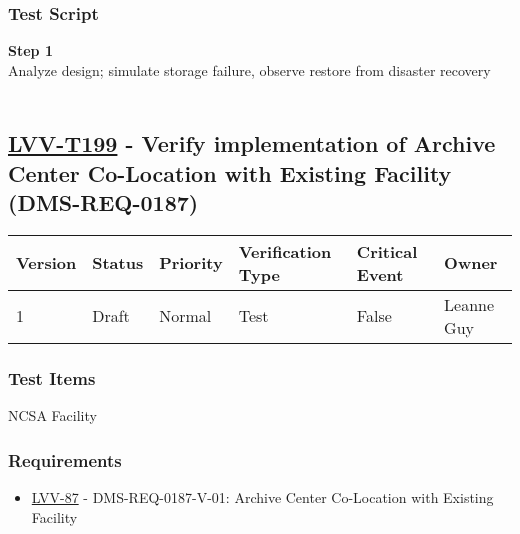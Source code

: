 \hypertarget{test-script-175}{%
\subsubsection{Test Script}\label{test-script-175}}

\textbf{Step 1}\\
Analyze design; simulate storage failure, observe restore from disaster
recovery\\
~\\

\hypertarget{lvv-t199---verify-implementation-of-archive-center-co-location-with-existing-facility-dms-req-0187}{%
\subsection{\texorpdfstring{\href{https://jira.lsstcorp.org/secure/Tests.jspa\#/testCase/LVV-T199}{LVV-T199}
- Verify implementation of Archive Center Co-Location with Existing
Facility
(DMS-REQ-0187)}{LVV-T199 - Verify implementation of Archive Center Co-Location with Existing Facility (DMS-REQ-0187)}}\label{lvv-t199---verify-implementation-of-archive-center-co-location-with-existing-facility-dms-req-0187}}

\begin{longtable}[]{@{}llllll@{}}
\toprule
Version & Status & Priority & Verification Type & Critical Event &
Owner\tabularnewline
\midrule
\endhead
1 & Draft & Normal & Test & False & Leanne Guy\tabularnewline
\bottomrule
\end{longtable}

\hypertarget{test-items-175}{%
\subsubsection{Test Items}\label{test-items-175}}

NCSA Facility~

\hypertarget{requirements-176}{%
\subsubsection{Requirements}\label{requirements-176}}

\begin{itemize}
\tightlist
\item
  \href{https://jira.lsstcorp.org/browse/LVV-87}{LVV-87} -
  DMS-REQ-0187-V-01: Archive Center Co-Location with Existing Facility
\end{itemize}

